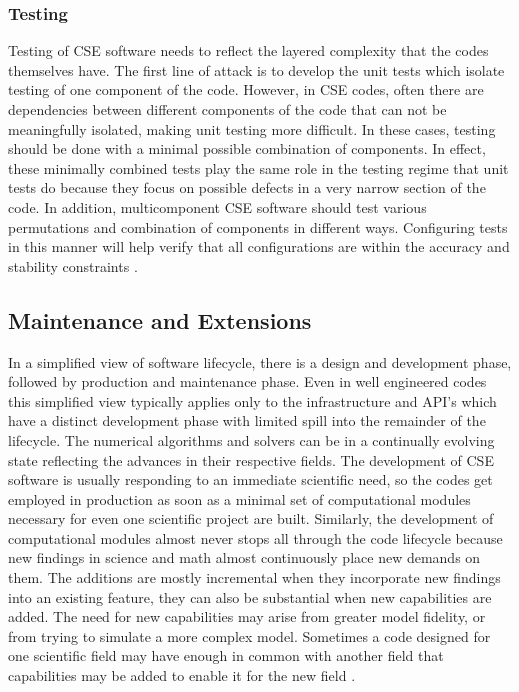 \subsubsection{Testing}
\label{sec:testing}
Testing of CSE software needs to reflect the layered complexity that
the codes themselves have. The first line of attack is to develop the
unit tests which isolate testing of one component of the
code. However, in CSE codes, often there are dependencies between
different components of the code that can not be meaningfully
isolated, making unit testing more difficult. In these cases, testing
should be done with a minimal possible combination of components.  In
effect, these minimally combined tests play the same role in the
testing regime that unit tests do because they focus on possible
defects in a very narrow section of the code. In addition,
multicomponent CSE software should test various  permutations and
combination of components in different ways. Configuring tests in this
manner will help verify that all configurations are within the
accuracy and stability constraints \cite{Dubey2015}.   

\subsection{Maintenance and Extensions}
\label{sec:maintain}
In a simplified view of software lifecycle, there is a design and development phase,
followed by production and maintenance phase.  Even in well engineered
codes this simplified view typically applies only to the
infrastructure and API's which have a distinct development phase with
limited spill into the remainder of the lifecycle. The numerical 
algorithms and solvers can be in a continually evolving state
reflecting the advances in their respective fields.  
The development of CSE software is usually responding to an immediate
scientific need, so the codes get employed in production as soon as a
minimal set of computational modules necessary for even one scientific
project are built.  Similarly, the development of computational
modules almost never stops all through the code lifecycle because new
findings in science and math almost continuously place new demands on
them. The additions are mostly incremental when they incorporate new
findings into an existing feature, they can also be substantial when
new capabilities are added. The need for new capabilities may arise
from  greater model fidelity, or from trying to simulate a more
complex model. Sometimes a code designed for one scientific field may
have enough in common with another field that capabilities may be
added to enable it for the new field \cite{Dubey2016}.    


